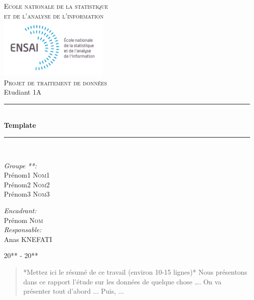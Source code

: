 \documentclass[french]{report}
\newcommand{\HRule}{\rule{\linewidth}{0.5mm}}
\begin{document}
\begin{titlepage}

\begin{center}

\textsc{{\LARGE Ecole nationale de la statistique \\et de l'analyse de l'information}} \\ %
\vspace{5mm}
\includegraphics[width=0.4\textwidth]{ensai_logo}\\[1.0 cm] %

\textsc{\LARGE Projet de traitement de données}\\[0.5cm]
{\Large Etudiant 1A}\\ [1cm]

\HRule \\[0.4cm]
{ \huge \bfseries Template}\\[0.4cm]

\HRule \\[1.5cm]


\begin{flushleft} \Large
\emph{Groupe **:}\\
Prénom1 \textsc{Nom1} \\
Prénom2 \textsc{Nom2} \\
Prénom3 \textsc{Nom3} \\
\end{flushleft}

\begin{flushright} \Large
\emph{Encadrant:} \\
Prénom \textsc{Nom} \\
\emph{Responsable:} \\
Anas \textsc{KNEFATI} \\

\end{flushright}


\vfill
{\large 20** - 20**}
\end{center}
\end{titlepage} 
\begin{abstract}
*Mettez ici le résumé de ce travail (environ 10-15 lignes)* Nous présentons dans ce rapport l'étude sur les données de quelque chose \dots.
On va présenter tout d'abord ... Puis, ...
\end{abstract}
\tableofcontents
\end{document}
